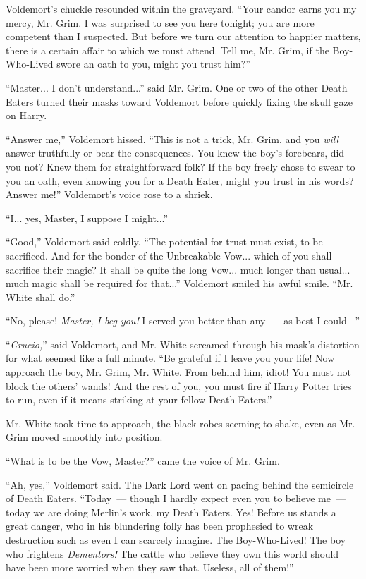 Voldemort's chuckle resounded within the graveyard. ``Your candor earns you my mercy, Mr. Grim. I was surprised to see you here tonight; you are more competent than I suspected. But before we turn our attention to happier matters, there is a certain affair to which we must attend. Tell me, Mr. Grim, if the Boy-Who-Lived swore an oath to you, might you trust him?''

``Master... I don't understand...'' said Mr. Grim. One or two of the other Death Eaters turned their masks toward Voldemort before quickly fixing the skull gaze on Harry.

``Answer me,'' Voldemort hissed. ``This is not a trick, Mr. Grim, and you \emph{will} answer truthfully or bear the consequences. You knew the boy's forebears, did you not? Knew them for straightforward folk? If the boy freely chose to swear to you an oath, even knowing you for a Death Eater, might you trust in his words? Answer me!'' Voldemort's voice rose to a shriek.

``I... yes, Master, I suppose I might...''

``Good,'' Voldemort said coldly. ``The potential for trust must exist, to be sacrificed. And for the bonder of the Unbreakable Vow... which of you shall sacrifice their magic? It shall be quite the long Vow... much longer than usual... much magic shall be required for that...'' Voldemort smiled his awful smile. ``Mr. White shall do.''

``No, please! \emph{Master, I beg you!} I served you better than any~--- as best I could~-''

``\emph{Crucio,}'' said Voldemort, and Mr. White screamed through his mask's distortion for what seemed like a full minute. ``Be grateful if I leave you your life! Now approach the boy, Mr. Grim, Mr. White. From behind him, idiot! You must not block the others' wands! And the rest of you, you must fire if Harry Potter tries to run, even if it means striking at your fellow Death Eaters.''

Mr. White took time to approach, the black robes seeming to shake, even as Mr. Grim moved smoothly into position.

``What is to be the Vow, Master?'' came the voice of Mr. Grim.

``Ah, yes,'' Voldemort said. The Dark Lord went on pacing behind the semicircle of Death Eaters. ``Today~--- though I hardly expect even you to believe me~--- today we are doing Merlin's work, my Death Eaters. Yes! Before us stands a great danger, who in his blundering folly has been prophesied to wreak destruction such as even I can scarcely imagine. The Boy-Who-Lived! The boy who frightens \emph{Dementors!} The cattle who believe they own this world should have been more worried when they saw that. Useless, all of them!''

